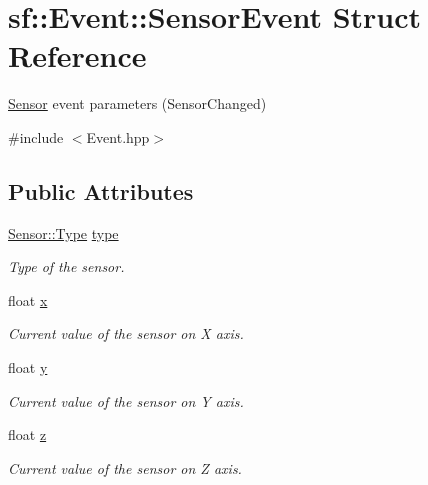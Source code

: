 \hypertarget{structsf_1_1_event_1_1_sensor_event}{}\section{sf\+:\+:Event\+:\+:Sensor\+Event Struct Reference}
\label{structsf_1_1_event_1_1_sensor_event}


\hyperlink{classsf_1_1_sensor}{Sensor} event parameters (Sensor\+Changed)  




{\ttfamily \#include $<$Event.\+hpp$>$}

\subsection*{Public Attributes}
\begin{DoxyCompactItemize}
\item 
\mbox{\label{structsf_1_1_event_1_1_sensor_event_abee7d67bf0947fd1138e4466011e2436}} 
\hyperlink{classsf_1_1_sensor_a687375af3ab77b818fca73735bcaea84}{Sensor\+::\+Type} \hyperlink{structsf_1_1_event_1_1_sensor_event_abee7d67bf0947fd1138e4466011e2436}{type}
\begin{DoxyCompactList}\small\item\em Type of the sensor. \end{DoxyCompactList}\item 
\mbox{\label{structsf_1_1_event_1_1_sensor_event_aa6ccbd13c181b866a6467462158d93d9}} 
float \hyperlink{structsf_1_1_event_1_1_sensor_event_aa6ccbd13c181b866a6467462158d93d9}{x}
\begin{DoxyCompactList}\small\item\em Current value of the sensor on X axis. \end{DoxyCompactList}\item 
\mbox{\label{structsf_1_1_event_1_1_sensor_event_aecafcd25ecb3ba486e42284e4bb69a57}} 
float \hyperlink{structsf_1_1_event_1_1_sensor_event_aecafcd25ecb3ba486e42284e4bb69a57}{y}
\begin{DoxyCompactList}\small\item\em Current value of the sensor on Y axis. \end{DoxyCompactList}\item 
\mbox{\label{structsf_1_1_event_1_1_sensor_event_a5704e0d0b82b07f051cc858894f3ea43}} 
float \hyperlink{structsf_1_1_event_1_1_sensor_event_a5704e0d0b82b07f051cc858894f3ea43}{z}
\begin{DoxyCompactList}\small\item\em Current value of the sensor on Z axis. \end{DoxyCompactList}\end{DoxyCompactItemize}


